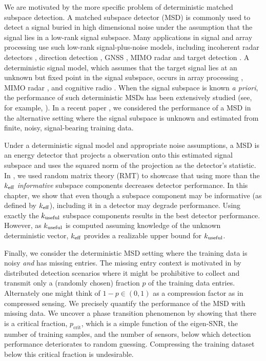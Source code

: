 We are motivated by the more specific problem of deterministic matched subspace
detection. A matched subspace detector (MSD) is commonly used to detect a signal buried in
high dimensional noise under the assumption that the signal lies in a low-rank signal
subspace. Many applications in signal and array processing use such low-rank
signal-plus-noise models, including incoherent radar detectors \cite{cui2013performance},
direction detection \cite{santiago2013noise,hu2013doa,liao2013direction}, GNSS
\cite{arribas2013antenna}, MIMO radar
\cite{chen2013adaptive,gorji2013widely,zhou2013space} and target detection
\cite{kwon2013multi}. A deterministic signal model, which assumes that the target signal
lies at an unknown but fixed point in the signal subspace, occurs in array processing
\cite{besson2005matched,bandiera2007glrt,bandiera2007adaptive}, MIMO radar
\cite{sirianunpiboon2013multiple}, and cognitive radio \cite{vazquez2011spatial}.
When the signal subspace is known \textit{a priori}, the performance of such deterministic
MSDs has been extensively studied (see, for example,
\cite{scharf1994matched,vincent2008matched,besson2006cfar}). In a recent paper
\cite{asendorf2013performance}, we considered the performance of a MSD in the alternative
setting where the signal subspace is unknown and estimated from finite, noisy,
signal-bearing training data.

Under a deterministic signal model and appropriate noise assumptions, a MSD is an energy
detector that projects a observation onto this estimated signal subspace and uses the
squared norm of the projection as the detector's statistic. In
\cite{asendorf2013performance}, we used random matrix theory (RMT) to showcase that using
more than the $k_\text{eff}$ \textit{informative} subspace components decreases detector
performance. In this chapter, we show that even though a subspace component may be informative (as
defined by $k_\text{eff}$), including it in a detector may degrade performance. Using exactly the
$k_{\text{useful}}$ subspace components results in the best detector performance. However, as $k_{\text{useful}}$
is computed assuming knowledge of the unknown deterministic vector, $k_\text{eff}$ provides a
realizable upper bound for $k_{\text{useful}}$.

Finally, we consider the deterministic MSD setting where the training data
is noisy \textit{and} has missing entries. The missing entry context is motivated in
\cite{balzano2010high} by distributed detection scenarios where it might be prohibitive to
collect and transmit only a (randomly chosen) fraction $p$ of the training data
entries. Alternately one might think of $1-p \in (0,1)$ as a compression factor as in
compressed sensing. We precisely quantify the performance of the MSD with missing data. We
uncover a phase transition phenomenon by showing that there is 
a critical fraction, $p_\text{crit}$, which is a simple function of the eigen-SNR, the
number of training samples, and the number of sensors, below which detection performance
deteriorates to random guessing. Compressing the training dataset below this critical
fraction is undesirable.

